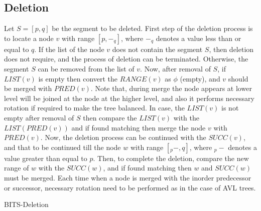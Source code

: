 \documentclass{article}
\begin{document}
\subsection{Deletion}  
Let $S=[p,q]$ be the segment to be deleted. First step of the deletion process is to locate a node $v$ with range $[p,-_q]$, where $-_q$ denotes a value less than or equal to $q$. If the list of the node $v$ does not contain the segment $S$, then deletion does not require, and the process of deletion can be terminated. Otherwise, the segment $S$ can be removed from the list of $v$. Now, after removal of $S$, if $LIST(v)$ is empty then convert the $RANGE(v)$ as $\phi$ (empty), and $v$ should be merged with $PRED(v)$. Note that, during merge the node appears at lower level will be joined at the node at the higher level, and also it performs necessary rotation if required to make the tree balanced. In case, the $LIST(v)$ is not empty after removal of $S$ then compare the $LIST(v)$ with the $LIST(PRED(v))$ and if found matching then merge the node $v$ with $PRED(v)$. Now, the deletion process can be continued with the $SUCC(v)$, and that to be continued till the node $w$ with range $[_p-,q]$, where $_p-$ denotes a value greater than equal to $p$. Then, to complete the deletion, compare the new range of $w$ with the $SUCC(w)$, and if found matching then $w$ and $SUCC(w)$ must be merged. Each time when a node is merged with the inorder predecessor or successor, necessary rotation need to be performed as in the case of AVL trees.
\par
\begin{algorithm}
\caption{BITS-Deletion}\label{a2}
\end{algorithm}
\end{document}
